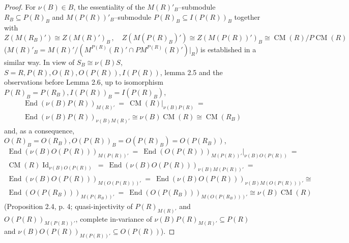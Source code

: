 \documentclass[a4paper,11pt]{article}
\DeclareMathOperator{\Id}{Id}
\DeclareMathOperator{\End}{End}
\DeclareMathOperator{\CM}{CM}
\begin{document}
\begin{proof}
For ${\nu(B)\in B}$, the essentiality of the $M(R)'_B$--submodule 
${R_B\subseteq P(R)_B}$ and $M(P(R))'_B$--submodule 
${P(R)_B\subseteq I(P(R))_B}$ together with   
\[
Z(M(R_B)') \cong Z(M(R)')_B\,,\quad 
Z(M(P(R)_B)')\cong Z(M(P(R))')_B\cong \CM(R)/P \CM(R)
\]
(${M(R)'_B=M(R)'/(M^{P(R)}(R)'\cap P M^{P(R)}(R)')|_R}$) is established in a 
similar way. In view of ${S_B\cong \nu(B) S}$, ${S=R, P(R), O(R), 
O(P(R)), I(P(R))}$, lemma 2.5 and the observations before Lemma 2.6, up to 
isomorphism ${P(R)_B=P(R_B), I(P(R))_B=I(P(R)_B)}$, 
\begin{multline*}
\End(\nu(B) P(R))_{M(R)'}\ =\ \CM(R)|_{\nu(B) P(R)}\ =
\\ 
\End(\nu(B) P(R))_{\nu(B) M(R)'}\cong 
\nu(B) \CM(R)\cong \CM(R_B)
\end{multline*}
and, as a consequence, ${O(R)_B=O(R_B), O(P(R))_B=O(P(R)_B)=O(P(R_B))}$,
\begin{multline*}
\End(\nu(B) O(P(R)))_{M(P(R))'}\ =\ 
\End(O(P(R)))_{M(P(R))'}|_{\nu(B) O(P(R))}\ =
\\ 
\CM(R) \Id_{\nu(B) O(P(R))}\ =\ 
\End(\nu(B) O(P(R)))_{\nu(B) M(P(R))'}\ =
\\  
\End(\nu(B) O(P(R)))_{M(O(P(R)))'}\ =\ 
\End(\nu(B) O(P(R)))_{\nu(B) M(O(P(R)))'}\cong
\\ 
\End(O(P(R_B)))_{M(P(R_B))'}\ =\ \End(O(P(R_B)))_{M(O(P(R_B)))'}\cong 
\nu(B) \CM(R)
\end{multline*}
(Proposition 2.4, p. 4; quasi-injectivity of $P(R)_{M(R)'}$ and 
$O(P(R))_{M(P(R))'}$, complete in-\linebreak variance of ${\nu(B) P(R)_{M(R)'}\subseteq 
P(R)}$ and ${\nu(B) O(P(R))_{M(P(R))'}\subseteq O(P(R))}$). 
\end{proof}
\end{document}
